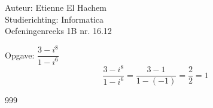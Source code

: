\documentclass[a4paper]{article}
\begin{document}
  
\noindent \large Auteur: Etienne El Hachem \\
\noindent \large Studierichting: Informatica\\
\noindent \large Oefeningenreeks 1B nr. 16.12\\

\medskip

\normalsize

Opgave: \(\dfrac{3 - i^8}{1 - i^6}\)\\

\[
\dfrac{3 - i^8}{1 - i^6} = \dfrac{3 - 1}{1 - (-1)} = \dfrac{2}{2} = 1
\]

\begin{thebibliography}{999}
\end{thebibliography}
\end{document}
